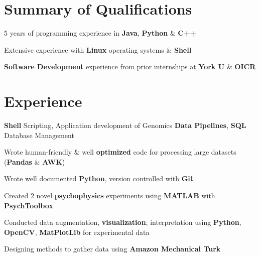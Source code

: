 \documentclass[]{chandan-cv}
\begin{document}
\begin{minipage}[t]{0.66\textwidth}


\section{Summary of Qualifications}
\runsubsection{ }
\descript{ }
\location{ }
\vspace{\topsep} %
\begin{tightemize}
	\item 5 years of programming experience in \textbf{Java}, \textbf{Python} \& \textbf{C++}
	\item Extensive experience with \textbf{Linux} operating systems \& \textbf{Shell}
	\item \textbf{Software Development} experience from prior internships at \textbf{York U} \& \textbf{OICR}
\end{tightemize}
\sectionsep


\section{Experience}
\begin{tightemize}
	\item \textbf{Shell} Scripting, Application development of Genomics \textbf{Data Pipelines}, \textbf{SQL} Database Management
	\item Wrote human-friendly & well \textbf{optimized} code for processing large datasets (\textbf{Pandas} \& \textbf{AWK})
	\item Wrote well documented \textbf{Python}, version controlled with \textbf{Git}
\end{tightemize}
\sectionsep

\begin{tightemize}
	\item Created 2 novel \textbf{psychophysics} experiments using \textbf{MATLAB} with \textbf{PsychToolbox}
	\item Conducted data augmentation, \textbf{visualization}, interpretation using \textbf{Python}, \textbf{OpenCV}, \textbf{MatPlotLib} for experimental data
	\item Designing methods to gather data using \textbf{Amazon Mechanical Turk}
\end{tightemize}
\sectionsep


\end{minipage}
\end{document}
